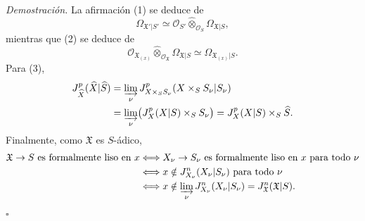 \smallskip
\noindent\textit{Demostración.}
La afirmación (1) se deduce de
\[
\Omega_{\mathfrak X'|S'}
\simeq
\mathcal O_{S'}\widehat\otimes_{\mathcal O_S}
\Omega_{\mathfrak X|S},
\]
mientras que (2) se deduce de
\[
\mathcal O_{\mathfrak X_{(x)}}
\widehat\otimes_{\mathcal O_{\mathfrak X}}
\Omega_{\mathfrak X|S}
\simeq\Omega_{\mathfrak X_{(x)}|S}.
\]
Para (3),
\[
\begin{aligned}
J_{\widehat X}^p(\widehat X|\widehat S)
&=\varinjlim_\nu
 J_{X\times_SS_\nu}^p(X\times_SS_\nu|S_\nu) \\
&=\varinjlim_\nu\bigl(J_X^p(X|S)\times_SS_\nu\bigr)
 =J_X^p(X|S)\times_S\widehat S.
\end{aligned}
\]
Finalmente, como $\mathfrak X$ es $S$-ádico,
\[
\begin{aligned}
\mathfrak X\to S\text{ es formalmente liso en }x
&\Longleftrightarrow
 X_\nu\to S_\nu\text{ es formalmente liso en }x
 \text{ para todo }\nu \\
&\Longleftrightarrow
 x\notin J_{X_\nu}^n(X_\nu|S_\nu)
 \text{ para todo }\nu \\
&\Longleftrightarrow
 x\notin\varinjlim_\nu J_{X_\nu}^n(X_\nu|S_\nu)
 =J_{\mathfrak X}^n(\mathfrak X|S).
\end{aligned}
\]
\hfill$\square$

